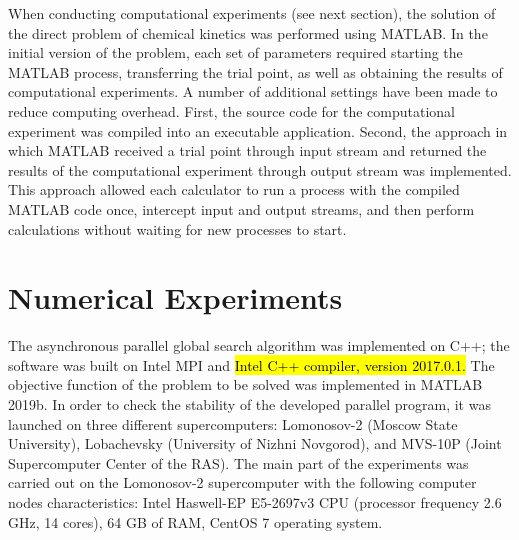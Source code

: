 \documentclass[mathematics,article,accept,pdftex,moreauthors]{Definitions/mdpi}
\begin{document}
	When conducting computational experiments (see next section), the solution of the direct problem of chemical kinetics was performed using MATLAB. In the initial version of the problem, each set of parameters required starting the MATLAB process, transferring the trial point, as well as obtaining the results of computational experiments. A number of additional settings have been made to reduce computing overhead. First, the source code for the computational experiment was compiled into an executable application. Second, the approach in which MATLAB received a trial point through input stream and returned the results of the computational experiment through output stream was implemented. This approach allowed each calculator to run a process with the compiled MATLAB code once, intercept input and output streams, and then perform calculations without waiting for new processes to start. 
	
	\section{Numerical Experiments}\label{sec_numexper}
	
	The asynchronous parallel global search algorithm was implemented on C++; the software was built on Intel MPI and \hl{Intel C++ compiler, version 2017.0.1.} %
 The objective function of the problem to be solved was implemented in MATLAB 2019b.
	In order to check the stability of the developed parallel program, it was launched on three different supercomputers: Lomonosov-2 (Moscow State University), Lobachevsky (University of Nizhni Novgorod), and MVS-10P (Joint Supercomputer Center of the RAS). The main part of the experiments was carried out on the Lomonosov-2 supercomputer with the following computer nodes characteristics: Intel Haswell-EP E5-2697v3 CPU (processor frequency 2.6 GHz, 14 cores), 64 GB of RAM, CentOS 7 operating system.
	
\end{document}

